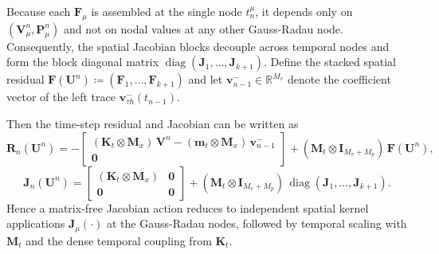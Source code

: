 \documentclass[DIV=16]{scrartcl}
\DeclareMathOperator{\diag}{diag}
\newcommand{\uu}{\boldsymbol v}
\begin{document}
Because each $\bm F_\mu$ is assembled at the single node $t_n^\mu$, it depends
only on $(\bm V_\mu^n,\bm P_\mu^n)$ and not on nodal values at any other
Gauss-Radau node.
Consequently, the spatial Jacobian blocks decouple across temporal nodes and
form the block diagonal matrix
$\diag(\bm J_1,\ldots,\bm J_{k+1})$.
Define the stacked spatial residual
$\bm F(\bm U^n)\coloneq (\bm F_1,\ldots,\bm F_{k+1})$ and let
$\bm v_{n-1}^-\in\mathbb R^{M_v}$ denote the coefficient vector of the left
trace $\uu_{\tau h}^-(t_{n-1})$.

Then the time-step residual and Jacobian can be written as
\begin{equation}\label{eq:slab-underint}
  \bm R_n(\bm U^n)
  =
  -
  \begin{bmatrix}
    (\bm K_t\otimes \bm M_x)\,\bm V^n - (\bm m_t\otimes \bm M_x)\,\bm v_{n-1}^-\\[0.2em]
    \bm 0
  \end{bmatrix}
  +
  (\bm M_t\otimes \bm I_{M_v+M_p})\,\bm F(\bm U^n),
\end{equation}
\begin{equation}\label{eq:slab-underint-jac}
  \bm J_n(\bm U^n)
  =
  \begin{bmatrix}
    (\bm K_t\otimes \bm M_x) &\bm 0\\[0.2em]
    \bm 0&\bm 0
  \end{bmatrix}
  +
  (\bm M_t\otimes \bm I_{M_v+M_p})\,
  \diag(\bm J_1,\ldots,\bm J_{k+1}).
\end{equation}
Hence a matrix-free Jacobian action reduces to independent spatial kernel
applications $\bm J_\mu(\cdot)$ at the Gauss-Radau nodes, followed by temporal
scaling with $\bm M_t$ and the dense temporal coupling from $\bm K_t$.
\end{document}
